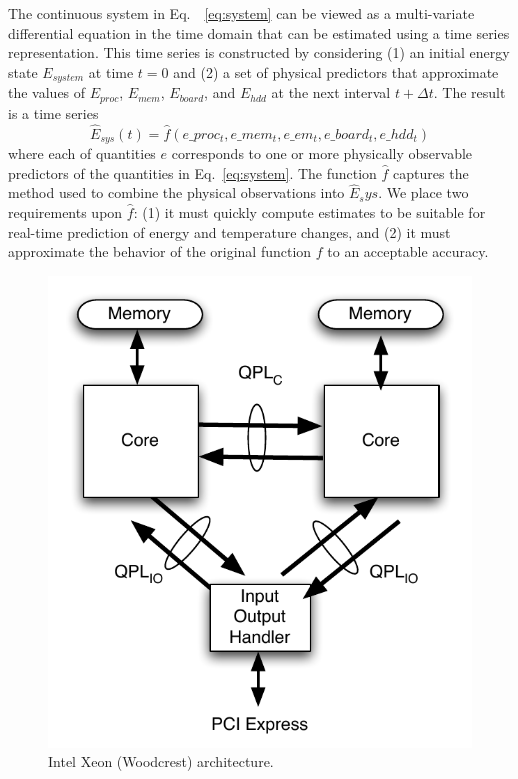 \documentclass[times, 10pt,twocolumn]{IEEEtran}
\newcommand{\equationnames}{Eq.\ }
\begin{document}
The continuous system in \equationnames~\eqref{eq:system} can be viewed as a
multi-variate differential equation in the time domain that can be
estimated using a time series representation. This time series is
constructed by considering (1) an initial energy state $E_{system}$ at
time $t=0$ and (2) a set of physical predictors that approximate the
values of $E_{proc}$, $E_{mem}$, $E_{board}$, and $E_{hdd}$ at the next
interval $t+\Delta t$.  The result is a time series
\begin{equation}
\label{eq:tseries}
\hat{E}_{sys}(t)=\hat{f}(e\_proc_{t},e\_mem_{t},e\_em_{t},e\_board_{t},e\_hdd_{t})
\end{equation}
where each of quantities $e$ corresponds to one or more physically
observable predictors of the quantities in Eq.~\eqref{eq:system}. The
function $\hat{f}$ captures the method used to combine the physical
observations into $\hat{E}_sys$.  We place two requirements upon
$\hat{f}$: (1) it must quickly compute estimates to be suitable for
real-time prediction of energy and temperature changes, and (2) it must
approximate the behavior of the original function $f$ to an acceptable
accuracy.
\begin{figure}[tbph]
  \centering
  \includegraphics[scale=0.5]{intelnehalem}
  \caption{Intel Xeon (Woodcrest) architecture.}
  \label{fig:intarch}
\end{figure}
\end{document}
